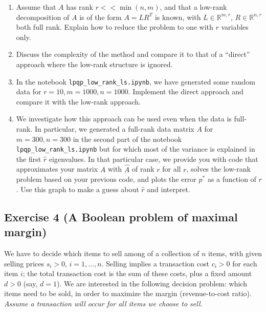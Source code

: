 \documentclass[11pt]{article}
\begin{document}
\begin{enumerate}
    \item Assume that $A$ has rank $r << \min(n,m)$, and that a low-rank decomposition of $A$ is of the form $A = LR^T$ is known, with $L \in \mathbb{R}^{m,r}$, $R \in \mathbb{R}^{n,r}$ both full rank. Explain how to reduce the problem to one with $r$ variables only.

    \item Discuss the complexity of the method and compare it to that of a ``direct'' approach where the low-rank structure is ignored.

    \item In the notebook \verb+lpqp_low_rank_ls.ipynb+, we have generated some random data for $r=10, m=1000, n=1000$. Implement the direct approach and compare it with the low-rank approach.

    \item We investigate how this approach can be used even when the data is full-rank. In particular, we generated a full-rank data matrix $A$ for $m=300, n=300$ in the second part of the notebook \verb+lpqp_low_rank_ls.ipynb+ but for which most of the variance is explained in the first $\hat{r}$ eigenvalues. In that particular case, we provide you with code that approximates your matrix $A$ with $\hat{A}$ of rank $r$ for all $r$, solves the low-rank problem based on your previous code, and plots the error $p^*$ as a function of $r$. Use this graph to make a guess about $\hat{r}$ and interpret.
\end{enumerate}

\begin{solution}
\end{solution}

\newpage
\subsection*{Exercise 4 (A Boolean problem of maximal margin)}

We have to decide which items to sell among of a collection of $n$ items, with given selling prices $s_i>0$, $i=1,\ldots,n$. Selling implies a transaction cost $c_i>0$ for each item $i$; the total transaction cost is the sum of these costs, plus a fixed amount $d>0$ (say, $d=1$). We are interested in the following decision problem: which items need to be sold, in order to maximize the margin (revenue-to-cost ratio). \textit{Assume a transaction will occur for all items we choose to sell.}
\end{document}
